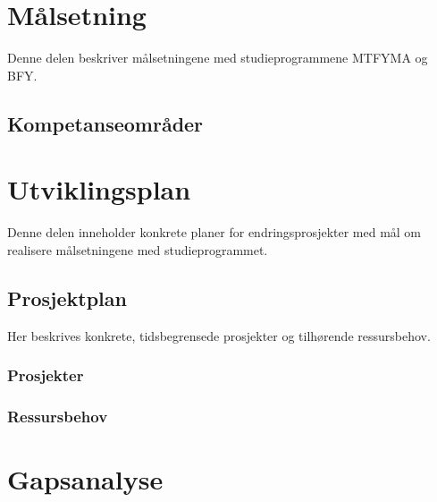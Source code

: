 \documentclass{memoir}
\begin{document}

\part{Målsetning}

Denne delen beskriver målsetningene med studieprogrammene MTFYMA og BFY.


\chapter{Kompetanseområder}






\appendix

\part{Utviklingsplan}

Denne delen inneholder konkrete planer for endringsprosjekter med mål om realisere målsetningene med studieprogrammet.

\chapter{Prosjektplan}

Her beskrives konkrete, tidsbegrensede prosjekter og tilhørende ressursbehov.

\section{Prosjekter}






\section{Ressursbehov}

\part{Gapsanalyse}


\end{document}
